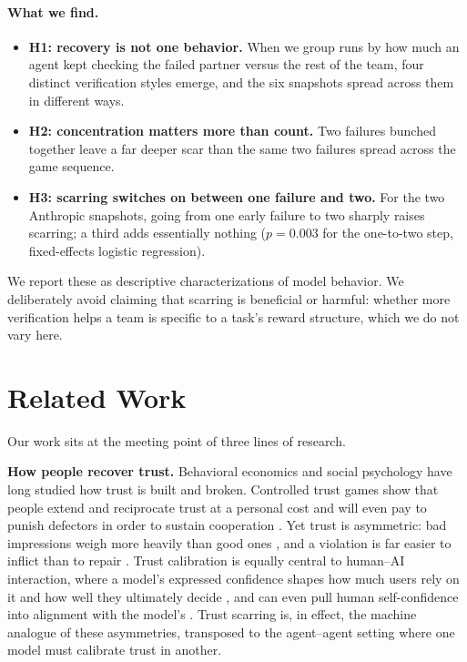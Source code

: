 \documentclass{article}
\begin{document}
\paragraph{What we find.}
\begin{itemize}[leftmargin=*, itemsep=2pt, topsep=2pt]
  \item \textbf{H1: recovery is not one behavior.} When we group runs by how much an agent kept checking the failed partner versus the rest of the team, four distinct verification styles emerge, and the six snapshots spread across them in different ways.
  \item \textbf{H2: concentration matters more than count.} Two failures bunched together leave a far deeper scar than the same two failures spread across the game sequence.
  \item \textbf{H3: scarring switches on between one failure and two.} For the two Anthropic snapshots, going from one early failure to two sharply raises scarring; a third adds essentially nothing ($p=0.003$ for the one-to-two step, fixed-effects logistic regression).
\end{itemize}

We report these as descriptive characterizations of model behavior. We deliberately avoid claiming that scarring is beneficial or harmful: whether more verification helps a team is specific to a task's reward structure, which we do not vary here.

\section{Related Work}
\label{sec:related}

Our work sits at the meeting point of three lines of research.

\textbf{How people recover trust.} Behavioral economics and social psychology have long studied how trust is built and broken. Controlled trust games show that people extend and reciprocate trust at a personal cost \cite{berg1995trust} and will even pay to punish defectors in order to sustain cooperation \cite{fehr2002altruistic, axelrod1984evolution}. Yet trust is asymmetric: bad impressions weigh more heavily than good ones \cite{baumeister2001bad, slovic1993perceived}, and a violation is far easier to inflict than to repair \cite{schweitzer2006promises, kim2004removing}. Trust calibration is equally central to human--AI interaction, where a model's expressed confidence shapes how much users rely on it and how well they ultimately decide \cite{li2024miscalibrated}, and can even pull human self-confidence into alignment with the model's \cite{li2025confidence}. Trust scarring is, in effect, the machine analogue of these asymmetries, transposed to the agent--agent setting where one model must calibrate trust in another.
\end{document}
